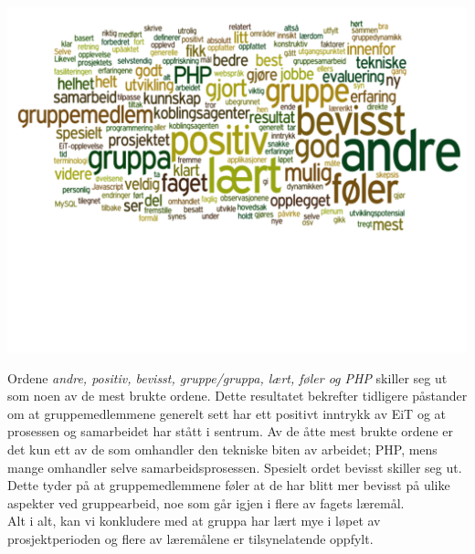 \begin{center}
\includegraphics[clip=true, width=1 \textwidth,
trim=0cm 5.5cm 0cm 0cm]{ordsky.pdf}
\label{fig:Ordsky}
\end{center}

Ordene \textit{andre, positiv, bevisst, gruppe/gruppa, lært, føler og PHP} skiller seg ut som noen av de mest brukte ordene. Dette resultatet bekrefter tidligere påstander om at gruppemedlemmene generelt sett har ett positivt inntrykk av EiT og at prosessen og samarbeidet har stått i sentrum. Av de åtte mest brukte ordene er det kun ett av de som omhandler den tekniske biten av arbeidet; PHP, mens mange omhandler selve samarbeidsprosessen. Spesielt ordet bevisst skiller seg ut. Dette tyder på at gruppemedlemmene føler at de har blitt mer bevisst på ulike aspekter ved gruppearbeid, noe som går igjen i flere av fagets læremål.\\

Alt i alt, kan vi konkludere med at gruppa har lært mye i løpet av prosjektperioden og flere av læremålene er tilsynelatende oppfylt.\\
